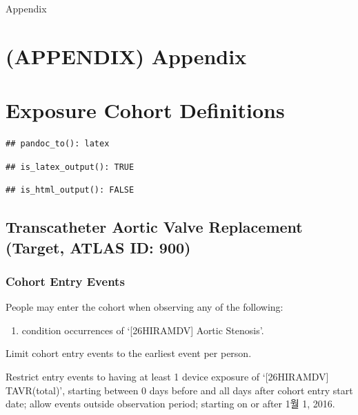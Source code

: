 \documentclass[
  12pt,
]{article}
\providecommand{\tightlist}{%
  \setlength{\itemsep}{0pt}\setlength{\parskip}{0pt}}
\begin{document}
\clearpage

\centerline{\Huge Appendix}

\section*{(APPENDIX) Appendix}\label{appendix-appendix}

\section{Exposure Cohort Definitions}\label{exposure-cohort-definitions}

\begin{verbatim}
## pandoc_to(): latex
\end{verbatim}

\begin{verbatim}
## is_latex_output(): TRUE
\end{verbatim}

\begin{verbatim}
## is_html_output(): FALSE
\end{verbatim}

\subsection{Transcatheter Aortic Valve Replacement (Target, ATLAS ID:
900)}\label{transcatheter-aortic-valve-replacement-target-atlas-id-900}

\subsubsection{Cohort Entry Events}\label{cohort-entry-events}

People may enter the cohort when observing any of the following:

\begin{enumerate}
\def\labelenumi{\arabic{enumi}.}
\tightlist
\item
  condition occurrences of `{[}26HIRAMDV{]} Aortic Stenosis'.
\end{enumerate}

Limit cohort entry events to the earliest event per person.

Restrict entry events to having at least 1 device exposure of
`{[}26HIRAMDV{]} TAVR(total)', starting between 0 days before and all
days after cohort entry start date; allow events outside observation
period; starting on or after 1월 1, 2016.
\end{document}
